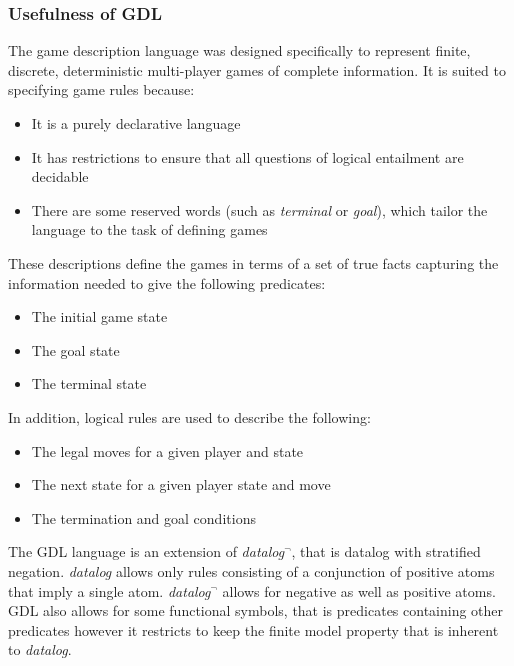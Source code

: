 \subsubsection{Usefulness of GDL}
The game description language was designed specifically to represent finite, discrete, deterministic multi-player games of complete information. It is suited to specifying game rules because:
\begin{itemize}
\item It is a purely declarative language
\item It has restrictions to ensure that all questions of logical entailment are decidable
\item There are some reserved words (such as \textit{terminal} or \textit{goal}), which tailor the language to the task of defining games
\end{itemize}
These descriptions define the games in terms of a set of true facts capturing the information needed to give the following predicates:
\begin{itemize}
\item The initial game state
\item The goal state
\item The terminal state
\end{itemize}
In addition, logical rules are used to describe the following:
\begin{itemize}
\item The legal moves for a given player and state
\item The next state for a given player state and move
\item The termination and goal conditions
\end{itemize}

The GDL language is an extension of \textit{datalog$^{\neg}$}, that is datalog with stratified negation\cite{GDL_Spec}. \textit{datalog} allows only rules consisting of a conjunction of positive atoms that imply a single atom. \textit{datalog$^{\neg}$} allows for negative as well as positive atoms\cite{Alice/Foundations}. GDL also allows for some functional symbols, that is predicates containing other predicates however it restricts to keep the finite model property that is inherent to \textit{datalog}\cite{GDL_Spec}.

